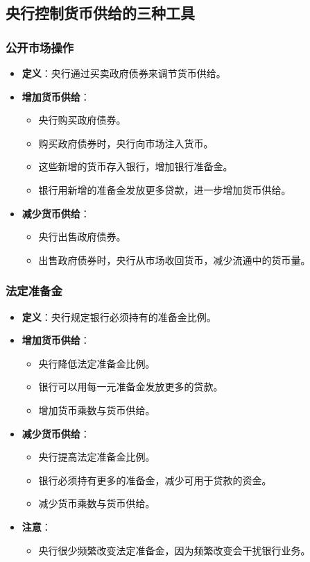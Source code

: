 \documentclass[12pt, a4paper]{article}
\begin{document}
\subsection{央行控制货币供给的三种工具}

\subsubsection{公开市场操作}
\begin{itemize}
    \item \textbf{定义}：央行通过买卖政府债券来调节货币供给。
    \item \textbf{增加货币供给}：
    \begin{itemize}
        \item 央行购买政府债券。
        \item 购买政府债券时，央行向市场注入货币。
        \item 这些新增的货币存入银行，增加银行准备金。
        \item 银行用新增的准备金发放更多贷款，进一步增加货币供给。
    \end{itemize}
    \item \textbf{减少货币供给}：
    \begin{itemize}
        \item 央行出售政府债券。
        \item 出售政府债券时，央行从市场收回货币，减少流通中的货币量。
    \end{itemize}
\end{itemize}

\subsubsection{法定准备金}
\begin{itemize}
    \item \textbf{定义}：央行规定银行必须持有的准备金比例。
    \item \textbf{增加货币供给}：
    \begin{itemize}
        \item 央行降低法定准备金比例。
        \item 银行可以用每一元准备金发放更多的贷款。
        \item 增加货币乘数与货币供给。
    \end{itemize}
    \item \textbf{减少货币供给}：
    \begin{itemize}
        \item 央行提高法定准备金比例。
        \item 银行必须持有更多的准备金，减少可用于贷款的资金。
        \item 减少货币乘数与货币供给。
    \end{itemize}
    \item \textbf{注意}：
    \begin{itemize}
        \item 央行很少频繁改变法定准备金，因为频繁改变会干扰银行业务。
    \end{itemize}
\end{itemize}
\end{document}
